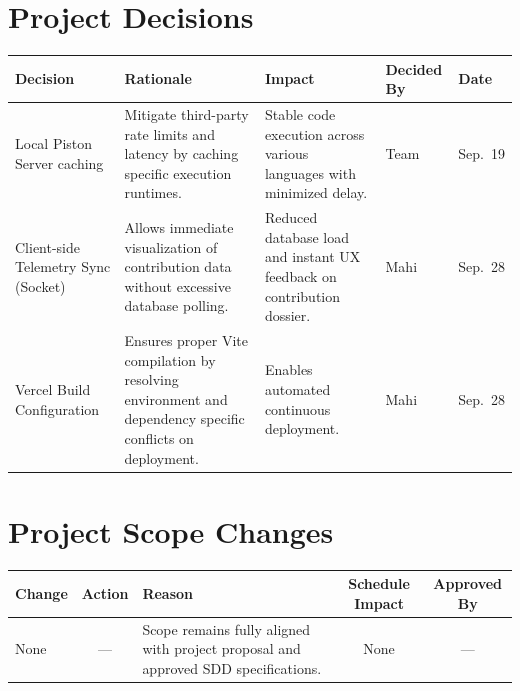 \documentclass[11pt,a4paper]{article}
\begin{document}
\section{Project Decisions}

\begin{table}[htbp]
\centering
\label{tab:project-decisions}
\renewcommand{\arraystretch}{1.3}

\begin{tabular}{>{\raggedright\arraybackslash}p{3.2cm}
                >{\raggedright\arraybackslash}p{4.0cm}
                >{\raggedright\arraybackslash}p{3.5cm}
                >{\centering\arraybackslash}p{2.0cm}
                >{\centering\arraybackslash}p{1.5cm}}
\toprule
\textbf{Decision} &
\textbf{Rationale} &
\textbf{Impact} &
\textbf{Decided By} &
\textbf{Date} \\
\midrule

Local Piston Server caching &
Mitigate third-party rate limits and latency by caching specific execution runtimes. &
Stable code execution across various languages with minimized delay. &
Team &
Sep.\ 19 \\

Client-side Telemetry Sync (Socket) &
Allows immediate visualization of contribution data without excessive database polling. &
Reduced database load and instant UX feedback on contribution dossier. &
Mahi &
Sep.\ 28 \\

Vercel Build Configuration &
Ensures proper Vite compilation by resolving environment and dependency specific conflicts on deployment. &
Enables automated continuous deployment. &
Mahi &
Sep.\ 28 \\

\bottomrule
\end{tabular}
\end{table}

\section{Project Scope Changes}

\begin{table}[htbp]
\centering
\label{tab:scope-changes}
\renewcommand{\arraystretch}{1.25}

\begin{tabular}{p{3.0cm} c p{3.2cm} c c}
\toprule
\textbf{Change} &
\textbf{Action} &
\textbf{Reason} &
\textbf{Schedule Impact} &
\textbf{Approved By} \\
\midrule

None & --- & Scope remains fully aligned with project proposal and approved SDD specifications. & None & --- \\

\bottomrule
\end{tabular}
\end{table}
\end{document}
